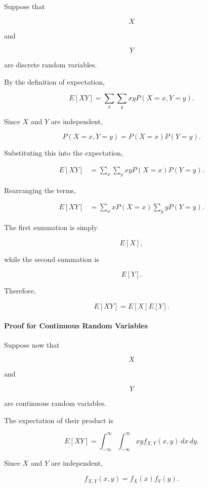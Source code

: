 \documentclass[11pt]{article}
\begin{document}
\begin{mdframed}[
		linewidth=0.8pt,
		roundcorner=6pt,
		backgroundcolor=gray!5,
		linecolor=gray!60,
		innertopmargin=10pt,
		innerbottommargin=10pt,
		innerleftmargin=10pt,
		innerrightmargin=10pt
		]
		Suppose that
		
		\[
		X
		\]
		
		and
		
		\[
		Y
		\]
		
		are discrete random variables.
		
		By the definition of expectation,
		
		\[
		E[XY]
		=
		\sum_x
		\sum_y
		xyP(X=x,Y=y).
		\]
		
		Since \(X\) and \(Y\) are independent,
		
		\[
		P(X=x,Y=y)
		=
		P(X=x)P(Y=y).
		\]
		
		Substituting this into the expectation,
		
		\[
		\begin{aligned}
			E[XY]
			&=
			\sum_x
			\sum_y
			xyP(X=x)P(Y=y).
		\end{aligned}
		\]
		
		Rearranging the terms,
		
		\[
		\begin{aligned}
			E[XY]
			&=
			\sum_x
			xP(X=x)
			\sum_y
			yP(Y=y).
		\end{aligned}
		\]
		
		The first summation is simply
		
		\[
		E[X],
		\]
		
		while the second summation is
		
		\[
		E[Y].
		\]
		
		Therefore,
		
		\[
		\boxed{
			E[XY]
			=
			E[X]E[Y].
		}
		\]
		
		\bigskip
		
		\paragraph{Proof for Continuous Random Variables}
		
		Suppose now that
		
		\[
		X
		\]
		
		and
		
		\[
		Y
		\]
		
		are continuous random variables.
		
		The expectation of their product is
		
		\[
		E[XY]
		=
		\int_{-\infty}^{\infty}
		\int_{-\infty}^{\infty}
		xy
		f_{X,Y}(x,y)
		\,dx\,dy.
		\]
		
		Since \(X\) and \(Y\) are independent,
		
		\[
		f_{X,Y}(x,y)
		=
		f_X(x)f_Y(y).
		\]
		

\end{mdframed}
\end{document}
